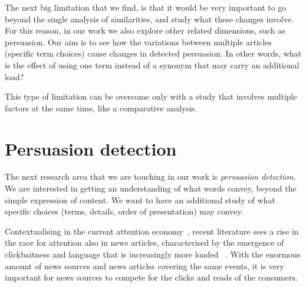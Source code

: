 The next big limitation that we find, is that it would be very important to go beyond the single analysis of similarities, and study what these changes involve.
For this reason, in our work we also explore other related dimensions, such as persuasion.
Our aim is to see how the variations between multiple articles (specific term choices) cause changes in detected persuasion. In other words, what is the effect of using one term instead of a synonym that may carry an additional load?


This type of limitation can be overcome only with a study that involves multiple factors at the same time, like a comparative analysis.

\section{\statusgreen Persuasion detection}
\label{sec:lit_persuasion}

The next research area that we are touching in our work is \emph{persuasion detection}.
We are interested in getting an understanding of what words convey, beyond the simple expression of content.
We want to have an additional study of what specific choices (terms, details, order of presentation) may convey.



Contextualising in the current attention economy~\citep{davenport2001attention}, recent literature sees a rise in the race for attention also in news articles, characterised by the emergence of clickbaitness and language that is increasingly more loaded ~\citep{bazaco2019clickbait,davenport2001attention}.
With the enormous amount of news sources and news articles covering the same events, it is very important for news sources to compete for the clicks and reads of the consumers.

